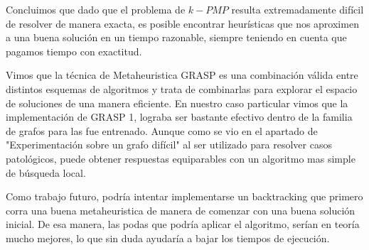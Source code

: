Concluimos que dado que el problema de $k-PMP$ resulta extremadamente difícil de resolver de manera exacta, es posible encontrar heurísticas que nos aproximen a una buena solución en un tiempo razonable, siempre teniendo en cuenta que pagamos tiempo con exactitud.

Vimos que la técnica de Metaheuristica GRASP es una combinación válida entre distintos esquemas de algoritmos y trata de combinarlas para explorar el espacio de soluciones de una manera eficiente. En nuestro caso particular vimos que la implementación de GRASP 1, lograba ser bastante efectivo dentro de la familia de grafos para las fue entrenado. Aunque como se vio en el apartado de "Experimentación sobre un grafo difícil" al ser utilizado para resolver casos patológicos, puede obtener respuestas equiparables con un algoritmo mas simple de búsqueda local.

Como trabajo futuro, podría intentar implementarse un backtracking que primero corra una buena metaheuristica de manera de comenzar con una buena solución inicial. De esa manera, las podas que podría aplicar el algoritmo, serían en teoría mucho mejores, lo que sin duda ayudaría a bajar los tiempos de ejecución.